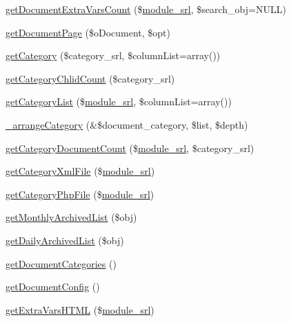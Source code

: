 \begin{DoxyCompactItemize}
\item 
\hyperlink{classdocumentModel_a91d03a635279fda1053a111ce13414b7}{get\-Document\-Extra\-Vars\-Count} (\$\hyperlink{ko_8install_8php_a370bb6450fab1da3e0ed9f484a38b761}{module\-\_\-srl}, \$search\-\_\-obj=N\-U\-L\-L)
\item 
\hyperlink{classdocumentModel_ac0d3f410a02bb462264c0ee902da4c8b}{get\-Document\-Page} (\$o\-Document, \$opt)
\item 
\hyperlink{classdocumentModel_a69db7f82ad9b45930a1531de4a88771f}{get\-Category} (\$category\-\_\-srl, \$column\-List=array())
\item 
\hyperlink{classdocumentModel_a9f645cdbdf163a360e7b018d6b499929}{get\-Category\-Chlid\-Count} (\$category\-\_\-srl)
\item 
\hyperlink{classdocumentModel_adb678b449b3b58d326f734870b478f8c}{get\-Category\-List} (\$\hyperlink{ko_8install_8php_a370bb6450fab1da3e0ed9f484a38b761}{module\-\_\-srl}, \$column\-List=array())
\item 
\hyperlink{classdocumentModel_adf3fb12772da62d991c1cd6638870740}{\-\_\-arrange\-Category} (\&\$document\-\_\-category, \$list, \$depth)
\item 
\hyperlink{classdocumentModel_a4d0ae40ec03a5dad5cb3c636a0475925}{get\-Category\-Document\-Count} (\$\hyperlink{ko_8install_8php_a370bb6450fab1da3e0ed9f484a38b761}{module\-\_\-srl}, \$category\-\_\-srl)
\item 
\hyperlink{classdocumentModel_ac281e6514ac76ffedcff7b89d0bcb130}{get\-Category\-Xml\-File} (\$\hyperlink{ko_8install_8php_a370bb6450fab1da3e0ed9f484a38b761}{module\-\_\-srl})
\item 
\hyperlink{classdocumentModel_a0b93c54ebe6ae6730169d25f09dd91d5}{get\-Category\-Php\-File} (\$\hyperlink{ko_8install_8php_a370bb6450fab1da3e0ed9f484a38b761}{module\-\_\-srl})
\item 
\hyperlink{classdocumentModel_a5e28d43ec8cba93b8017c169a2b57b23}{get\-Monthly\-Archived\-List} (\$obj)
\item 
\hyperlink{classdocumentModel_a9f7ad689da9b5a7b8f75fa2e48aec80a}{get\-Daily\-Archived\-List} (\$obj)
\item 
\hyperlink{classdocumentModel_a38ed2ba51a4ab187f2dd14e6dd92f5cc}{get\-Document\-Categories} ()
\item 
\hyperlink{classdocumentModel_a2e9e6fc1cc405b6c71c38b247f51756a}{get\-Document\-Config} ()
\item 
\hyperlink{classdocumentModel_a21dffa7f96fc5f28c525650dbd3bbba4}{get\-Extra\-Vars\-H\-T\-M\-L} (\$\hyperlink{ko_8install_8php_a370bb6450fab1da3e0ed9f484a38b761}{module\-\_\-srl})

\end{DoxyCompactItemize}
